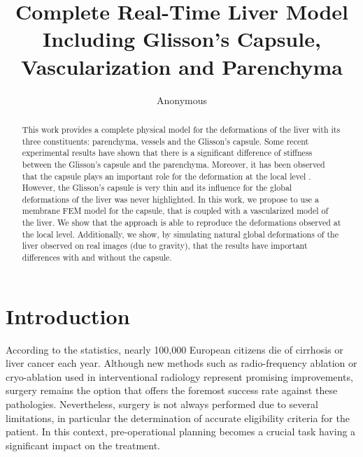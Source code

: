 \documentclass{llncs}
\begin{document}
%
%
\mainmatter              %
%
\title{Complete Real-Time Liver Model Including Glisson's Capsule, Vascularization and Parenchyma}
%
%
\author{Anonymous}
%
%
%
\maketitle

\begin{abstract}
This work provides a complete physical model for the deformations of the liver with its three constituents: parenchyma, vessels and the Glisson's capsule.
Some recent experimental results \cite{Ahn2010} have shown that there is a significant difference of stiffness between the Glisson's capsule and the parenchyma. 
Moreover, it has been observed that the capsule plays an important role for the deformation at the local level \cite{Hollenstein2006}.
However, the Glisson's capsule is very thin and its influence for the global deformations of the liver was never highlighted.
In this work, we propose to use a membrane FEM model for the capsule, that is coupled with a vascularized model of the liver.
We show that the approach is able to reproduce the deformations observed at the local level.
Additionally, we show, by simulating natural global deformations of the liver observed on real images (due to gravity), that the results have important differences with and without the capsule.

\end{abstract}

\section{Introduction} 
According to the statistics, nearly 100,000 European citizens die of cirrhosis or liver cancer each year. 
Although new methods such as radio-frequency ablation or cryo-ablation used in interventional radiology 
represent promising improvements, surgery remains the option that offers the foremost success rate against these pathologies. 
Nevertheless, surgery is not always performed due to several limitations, in particular the determination 
of accurate eligibility criteria for the patient. 
In this context, pre-operational planning becomes a crucial task having a significant impact on the treatment. 
\end{document}
